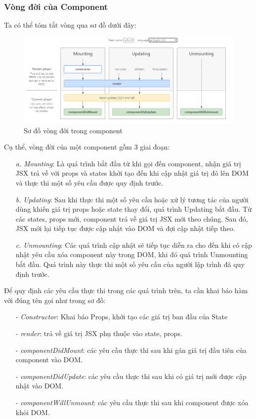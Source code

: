 \subsubsection{Vòng đời của Component}
    Ta có thể tóm tắt vòng qua sơ đồ dưới đây:
    \begin{figure}[!ht]
        \centering
        \includegraphics[width=1\textwidth]{images/lifeCircle.png}
        \caption{Sơ đồ vòng đời trong component}
    \end{figure}

    Cụ thể, vòng đời của một component gồm 3 giai đoạn:
    \begin{enumerate}
        \item[\textit{a.}] {\textit{Mounting}}: Là quá trình bắt đầu từ khi gọi đến component, nhận giá trị JSX trả về với props và states khởi tạo đến khi cập nhật giá trị đó lên DOM và thực thi một số yêu cầu được quy định trước.
        \item[\textit{b.}] {\textit{Updating}}: Sau khi thực thi một số yêu cầu hoặc xử lý tương tác của người dùng khiến giá trị props hoặc state thay đổi, quá trình Updating bắt đầu. Từ các states, props mới, component trả về giá trị JSX mới theo chúng. Sau đó, JSX mới lại tiếp tục được cập nhật vào DOM và đợi cập nhật tiếp theo.
        \item[\textit{c.}] {\textit{Unmounting}}: Các quá trình cập nhật sẽ tiếp tục diễn ra cho đến khi có cập nhật yêu cầu xóa component này trong DOM, khi đó quá trình Unmounting bắt đầu. Quá trình này thực thi một số yêu cầu của người lập trình đã quy định trước.
    \end{enumerate}

    Để quy định các yêu cầu thực thi trong các quá trình trên, ta cần khai báo hàm với đúng tên gọi như trong sơ đồ:
    \begin{enumerate}
        \item[-] {\textit{Constructor}}: Khai báo Props, khởi tạo các giá trị ban đầu của State
        \item[-] {\textit{render}}: trả về giá trị JSX phụ thuộc vào state, props.
        \item[-] {\textit{componentDidMount}}: các yêu cầu thực thi sau khi gán giá trị đầu tiên của component vào DOM.
        \item[-] {\textit{componentDidUpdate}}: các yêu cầu thực thi sau khi có giá trị mới được cập nhật vào DOM.
        \item[-] {\textit{componentWillUnmount}}: các yêu cầu thực thi sau khi component được xóa khỏi DOM.
    \end{enumerate}

